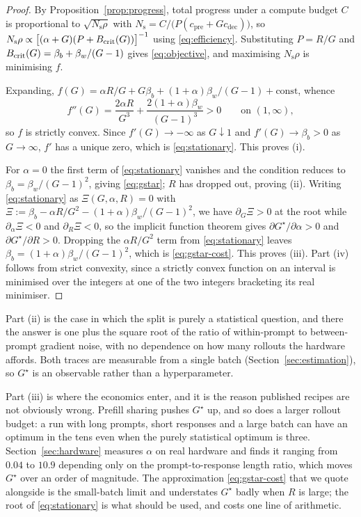 \begin{proof}
  By Proposition~\ref{prop:progress}, total progress under a compute budget $C$ is proportional to
  $\sqrt{N_{\mathrm{s}}\rho}$ with $N_{\mathrm{s}} = C/\big(P(c_{\mathrm{pre}} + Gc_{\mathrm{dec}})\big)$,
  so
  $N_{\mathrm{s}}\rho \propto \big[(\alpha+G)(P + B_{\mathrm{crit}}(G))\big]^{-1}$
  using \eqref{eq:efficiency}. Substituting $P = R/G$ and
  $B_{\mathrm{crit}}(G) = \beta_b + \beta_w/(G-1)$ gives \eqref{eq:objective}, and maximising
  $N_{\mathrm{s}}\rho$ is minimising $f$.

  Expanding, $f(G) = \alpha R/G + G\beta_b + (1+\alpha)\beta_w/(G-1) + \text{const}$, whence
  \begin{equation*}
    f''(G) = \frac{2\alpha R}{G^3} + \frac{2(1+\alpha)\beta_w}{(G-1)^3} > 0
    \qquad \text{on } (1,\infty),
  \end{equation*}
  so $f$ is strictly convex. Since $f'(G) \to -\infty$ as $G \downarrow 1$ and
  $f'(G) \to \beta_b > 0$ as $G \to \infty$, $f'$ has a unique zero, which is
  \eqref{eq:stationary}. This proves (i).

  For $\alpha = 0$ the first term of \eqref{eq:stationary} vanishes and the condition reduces to
  $\beta_b = \beta_w/(G-1)^2$, giving \eqref{eq:gstar}; $R$ has dropped out, proving (ii).
  Writing \eqref{eq:stationary} as $\Xi(G,\alpha,R) = 0$ with
  $\Xi := \beta_b - \alpha R/G^2 - (1+\alpha)\beta_w/(G-1)^2$, we have
  $\partial_G \Xi > 0$ at the root while $\partial_\alpha \Xi < 0$ and $\partial_R \Xi < 0$, so
  the implicit function theorem gives $\partial G^{\star}/\partial\alpha > 0$ and
  $\partial G^{\star}/\partial R > 0$. Dropping the $\alpha R/G^2$ term from
  \eqref{eq:stationary} leaves $\beta_b = (1+\alpha)\beta_w/(G-1)^2$, which is
  \eqref{eq:gstar-cost}. This proves (iii). Part (iv) follows from strict convexity, since a
  strictly convex function on an interval is minimised over the integers at one of the two
  integers bracketing its real minimiser.
\end{proof}

Part (ii) is the case in which the split is purely a statistical question, and there the answer is
one plus the square root of the ratio of within-prompt to between-prompt gradient noise, with no
dependence on how many rollouts the hardware affords. Both traces are measurable from a single
batch (Section~\ref{sec:estimation}), so $G^{\star}$ is an observable rather than a hyperparameter.

Part (iii) is where the economics enter, and it is the reason published recipes are not obviously
wrong. Prefill sharing pushes $G^{\star}$ up, and so does a larger rollout budget: a run with long
prompts, short responses and a large batch can have an optimum in the tens even when the purely
statistical optimum is three. Section~\ref{sec:hardware} measures $\alpha$ on real hardware and
finds it ranging from $0.04$ to $10.9$ depending only on the prompt-to-response length ratio, which
moves $G^{\star}$ over an order of magnitude. The approximation \eqref{eq:gstar-cost} that we quote
alongside is the small-batch limit and understates $G^{\star}$ badly when $R$ is large; the root of
\eqref{eq:stationary} is what should be used, and costs one line of arithmetic.

